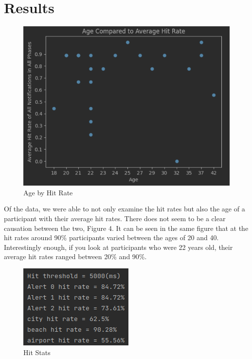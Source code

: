 \documentclass[manuscript,screen,review]{acmart}
\begin{document}
\section{Results}

\begin{figure}[h]
  \includegraphics[scale=0.5]{images/age-performance-scatter.png}
  \caption{Age by Hit Rate}
\end{figure}

Of the data, we were able to not only examine the hit rates but also the age of a participant with their average hit rates. There does not seem to be a clear causation between the two, Figure 4. It can be seen in the same figure that at the hit rates around 90\% participants varied between the ages of 20 and 40. Interestingly enough, if you look at participants who were 22 years old, their average hit rates ranged between 20\% and 90\%.

\begin{figure}[h]
  \includegraphics[scale=0.75]{images/hit-stats.png}
  \caption{Hit Stats}
\end{figure}
\end{document}
